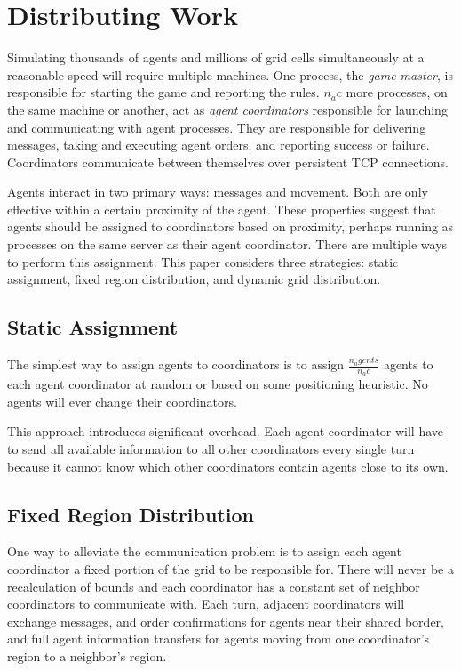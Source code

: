 \section{Distributing Work}

Simulating thousands of agents and millions of grid cells simultaneously at a reasonable speed will require multiple machines. One process, the \emph{game master}, is responsible for starting the game and reporting the rules. $n_ac$ more processes, on the same machine or another, act as \emph{agent coordinators} responsible for launching and communicating with agent processes. They are responsible for delivering messages, taking and executing agent orders, and reporting success or failure. Coordinators communicate between themselves over persistent TCP connections.

Agents interact in two primary ways: messages and movement. Both are only effective within a certain proximity of the agent. These properties suggest that agents should be assigned to coordinators based on proximity, perhaps running as processes on the same server as their agent coordinator. There are multiple ways to perform this assignment. This paper considers three strategies: static assignment, fixed region distribution, and dynamic grid distribution.

\subsection{Static Assignment}

The simplest way to assign agents to coordinators is to assign $\frac{n_agents}{n_ac}$ agents to each agent coordinator at random or based on some positioning heuristic. No agents will ever change their coordinators.

This approach introduces significant overhead. Each agent coordinator will have to send all available information to all other coordinators every single turn because it cannot know which other coordinators contain agents close to its own.

\subsection{Fixed Region Distribution}

One way to alleviate the communication problem is to assign each agent coordinator a fixed portion of the grid to be responsible for. There will never be a recalculation of bounds and each coordinator has a constant set of neighbor coordinators to communicate with. Each turn, adjacent coordinators will exchange messages, and order confirmations for agents near their shared border, and full agent information transfers for agents moving from one coordinator's region to a neighbor's region.

